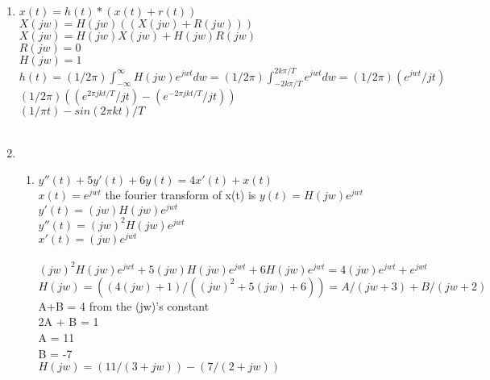 \documentclass[10pt,a4paper, margin=1in]{article}
\begin{document}
\begin{enumerate}
\item %
$x(t) = h(t) *(x(t)+r(t))$ \\
$X(jw) = H(jw)((X(jw)+R(jw)))$ \\
$X(jw) = H(jw)X(jw) + H(jw)R(jw)$ \\
$R(jw) = 0$ \\
$H(jw) = 1$ \\
$ h(t) = (1/2\pi) \int_{-\infty}^{\infty} H(jw)e^{jwt}dw = (1/2\pi)\int_{-2k\pi/T}^{2k\pi/T} e^{jwt}dw = (1/2\pi)(e^{jwt }/jt)$ \\
$(1/2\pi) ( (e^{2\pi jkt/T } / jt) - (e^{-2\pi jkt/T } / jt))$ \\
 $(1/ \pi t) - sin(2\pi kt)/T$ \\ \\



\item 
    \begin{enumerate}
    \item %
    $y''(t) + 5y'(t) + 6y(t) = 4x'(t) + x(t)$ \\
    $x(t) = e^{jwt} $ the fourier transform of x(t) is $y(t) = H(jw)e^{jwt}$\\
    $y'(t) = (jw)H(jw)e^{jwt}$ \\
    $y''(t) = (jw)^2H(jw)e^{jwt}$ \\
    $x'(t) = (jw)e^{jwt}$ \\ \\
    $(jw)^2H(jw)e^{jwt}+5(jw)H(jw)e^{jwt}+6H(jw)e^{jwt} = 4(jw)e^{jwt}+e^{jwt}$ \\
    $H(jw) =( (4(jw)+1) / ((jw)^2 + 5(jw) +6) ) = A / (jw+3) + B / (jw+2)$ \\
    A+B = 4 from the (jw)'s constant\\
    2A + B = 1 \\
    A = 11 \\
    B = -7 \\
    $H(jw) = (11/(3+jw)) -(7 / (2+jw))$\\
    

\end{enumerate}
\end{enumerate}
\end{document}
